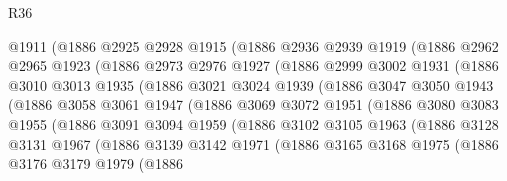 \begin{lexlean}{R36}
\begin{coremodule}
              @1911
              (@1886
                @2925
                @2928
                @1915
                (@1886
                  @2936
                  @2939
                  @1919
                  (@1886
                    @2962
                    @2965
                    @1923
                    (@1886
                      @2973
                      @2976
                      @1927
                      (@1886
                        @2999
                        @3002
                        @1931
                        (@1886
                          @3010
                          @3013
                          @1935
                          (@1886
                            @3021
                            @3024
                            @1939
                            (@1886
                              @3047
                              @3050
                              @1943
                              (@1886
                                @3058
                                @3061
                                @1947
                                (@1886
                                  @3069
                                  @3072
                                  @1951
                                  (@1886
                                    @3080
                                    @3083
                                    @1955
                                    (@1886
                                      @3091
                                      @3094
                                      @1959
                                      (@1886
                                        @3102
                                        @3105
                                        @1963
                                        (@1886
                                          @3128
                                          @3131
                                          @1967
                                          (@1886
                                            @3139
                                            @3142
                                            @1971
                                            (@1886
                                              @3165
                                              @3168
                                              @1975
                                              (@1886
                                                @3176
                                                @3179
                                                @1979
                                                (@1886

\end{coremodule}
\end{lexlean}
